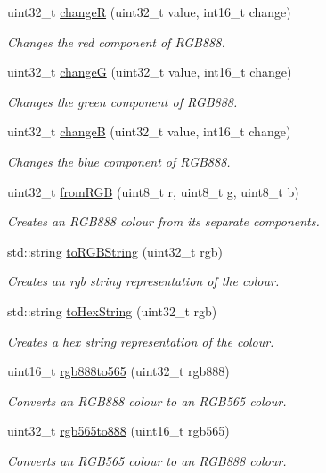 \begin{DoxyCompactItemize}
uint32\+\_\+t \mbox{\hyperlink{namespaceColour_ad2740cc3e6b9f1d65d6cfe085ec2f1bf}{changeR}} (uint32\+\_\+t value, int16\+\_\+t change)
\begin{DoxyCompactList}\small\item\em Changes the red component of R\+G\+B888. \end{DoxyCompactList}\item 
uint32\+\_\+t \mbox{\hyperlink{namespaceColour_a944d058dabcf1f24a5093a04656efc60}{changeG}} (uint32\+\_\+t value, int16\+\_\+t change)
\begin{DoxyCompactList}\small\item\em Changes the green component of R\+G\+B888. \end{DoxyCompactList}\item 
uint32\+\_\+t \mbox{\hyperlink{namespaceColour_a8e854e6a656f9d7c53dbd46eccba1816}{changeB}} (uint32\+\_\+t value, int16\+\_\+t change)
\begin{DoxyCompactList}\small\item\em Changes the blue component of R\+G\+B888. \end{DoxyCompactList}\item 
uint32\+\_\+t \mbox{\hyperlink{namespaceColour_a2ee4192ca3c1535351e57f223e5fb65d}{from\+R\+GB}} (uint8\+\_\+t r, uint8\+\_\+t g, uint8\+\_\+t b)
\begin{DoxyCompactList}\small\item\em Creates an R\+G\+B888 colour from its separate components. \end{DoxyCompactList}\item 
std\+::string \mbox{\hyperlink{namespaceColour_a317cf8c55a2ec6a9315b50079703ac8f}{to\+R\+G\+B\+String}} (uint32\+\_\+t rgb)
\begin{DoxyCompactList}\small\item\em Creates an rgb string representation of the colour. \end{DoxyCompactList}\item 
std\+::string \mbox{\hyperlink{namespaceColour_a2289444135d7196963b284cdd7f13fff}{to\+Hex\+String}} (uint32\+\_\+t rgb)
\begin{DoxyCompactList}\small\item\em Creates a hex string representation of the colour. \end{DoxyCompactList}\item 
uint16\+\_\+t \mbox{\hyperlink{namespaceColour_a5311fafb2011e62db5d600badee72ee9}{rgb888to565}} (uint32\+\_\+t rgb888)
\begin{DoxyCompactList}\small\item\em Converts an R\+G\+B888 colour to an R\+G\+B565 colour. \end{DoxyCompactList}\item 
uint32\+\_\+t \mbox{\hyperlink{namespaceColour_aa7b3de65f5d56d88b13863de9aa5641a}{rgb565to888}} (uint16\+\_\+t rgb565)
\begin{DoxyCompactList}\small\item\em Converts an R\+G\+B565 colour to an R\+G\+B888 colour. \end{DoxyCompactList}\end{DoxyCompactItemize}


